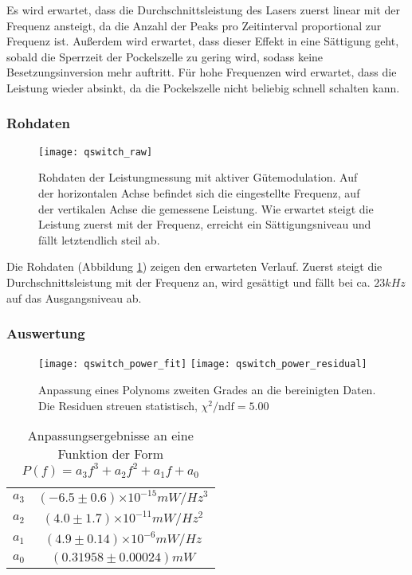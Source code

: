 \documentclass{../Misc/MontavonLaTeX/Montavon}
\newcommand{\e}[1]{\ensuremath{\times 10^{#1}}}
\newcommand{\halfwidth}{0.48\textwidth}
\begin{document}
Es wird erwartet, dass die Durchschnittsleistung des Lasers zuerst linear mit der Frequenz ansteigt, da die Anzahl der Peaks pro Zeitinterval proportional zur Frequenz ist. Außerdem wird erwartet, dass dieser Effekt in eine Sättigung geht, sobald die Sperrzeit der Pockelszelle zu gering wird, sodass keine Besetzungsinversion mehr auftritt. Für hohe Frequenzen wird erwartet, dass die Leistung wieder absinkt, da die Pockelszelle nicht beliebig schnell schalten kann.

\subsubsection{Rohdaten}
\begin{figure}[htbp]
\centering
\texttt{[image: qswitch\_raw]}
\caption{Rohdaten der Leistungmessung mit aktiver Gütemodulation. Auf der horizontalen Achse befindet sich die eingestellte Frequenz, auf der vertikalen Achse die gemessene Leistung. Wie erwartet steigt die Leistung zuerst mit der Frequenz, erreicht ein Sättigungsniveau und fällt letztendlich steil ab.}
\label{fig:qswitch_raw}
\end{figure}

Die Rohdaten (Abbildung \ref{fig:qswitch_raw}) zeigen den erwarteten Verlauf. Zuerst steigt die Durchschnittsleistung mit der Frequenz an, wird gesättigt und fällt bei ca. $23 \unit{kHz}$ auf das Ausgangsniveau ab.

\subsubsection{Auswertung}
\begin{figure}[htbp]
\centering
\texttt{[image: qswitch\_power\_fit]}
\texttt{[image: qswitch\_power\_residual]}
\caption{Anpassung eines Polynoms zweiten Grades an die bereinigten Daten. Die Residuen streuen statistisch, $\chi^2 / \textrm{ndf} = 5.00$}
\label{fig:qswitch_fit}
\end{figure}

\begin{table}[htbp]
\centering
\begin{tabular}{|c|c|}
\hline
$a_3$ & $(-6.5 \pm 0.6) \e{-15} \unit{mW/Hz^3}$ \\
$a_2$ & $(4.0 \pm 1.7) \e{-11} \unit{mW/Hz^2}$ \\
$a_1$ & $(4.9 \pm 0.14) \e{-6} \unit{mW/Hz}$ \\
$a_0$ & $(0.31958 \pm 0.00024) \unit{mW}$ \\
\hline
\end{tabular}
\caption{Anpassungsergebnisse an eine Funktion der Form $P(f) = a_3 f^3 + a_2 f^2 + a_1 f + a_0$}
\label{tbl:qswitch_fit}
\end{table}
\end{document}
